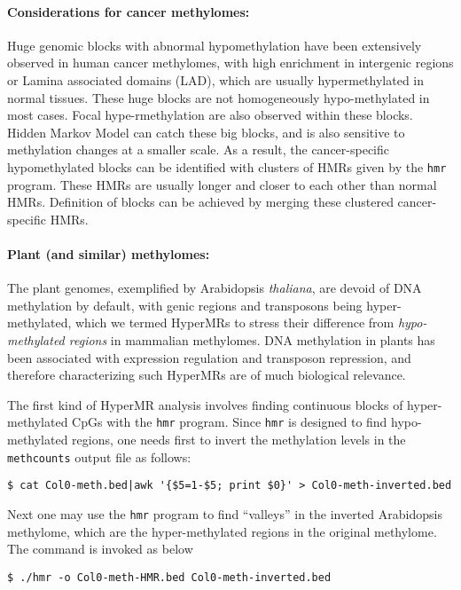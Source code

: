\documentclass[10pt]{article}
\newcommand{\prog}[1]{\texttt{#1}}
\begin{document}

\paragraph{Considerations for cancer methylomes:}
Huge genomic blocks with abnormal hypomethylation have been 
extensively observed in human cancer methylomes, with high enrichment in 
intergenic regions or Lamina associated domains (LAD), which are usually 
hypermethylated in normal tissues. These huge blocks are not homogeneously 
hypo-methylated in most cases. Focal hype-rmethylation are also observed 
within these blocks.  Hidden Markov Model can catch these big blocks, and is 
also sensitive to methylation changes at a smaller scale. As a result, the 
cancer-specific hypomethylated blocks can be identified with clusters of HMRs 
given by the \prog{hmr} program.  These HMRs are usually longer and closer to 
each other than normal HMRs.  Definition of blocks can be achieved by 
merging these clustered cancer-specific HMRs.


\paragraph{Plant (and similar) methylomes:} The plant genomes,
exemplified by Arabidopsis \textit{thaliana}, are devoid of DNA
methylation by default, with genic regions and transposons being
hyper-methylated, which we termed HyperMRs to stress their difference
from \textit{hypo-methylated regions} in mammalian methylomes. DNA
methylation in plants has been associated with expression regulation
and transposon repression, and therefore characterizing such HyperMRs
are of much biological relevance.

The first kind of HyperMR analysis involves finding continuous blocks
of hyper-methylated CpGs with the \prog{hmr} program. Since \prog{hmr}
is designed to find hypo-methylated regions, one needs first to invert
the methylation levels in the \prog{methcounts} output file as
follows:
\begin{verbatim}
$ cat Col0-meth.bed|awk '{$5=1-$5; print $0}' > Col0-meth-inverted.bed
\end{verbatim}
Next one may use the \prog{hmr} program to find ``valleys'' in the
inverted Arabidopsis methylome, which are the hyper-methylated regions
in the original methylome. The command is invoked as below
\begin{verbatim}
$ ./hmr -o Col0-meth-HMR.bed Col0-meth-inverted.bed
\end{verbatim}
\end{document}
